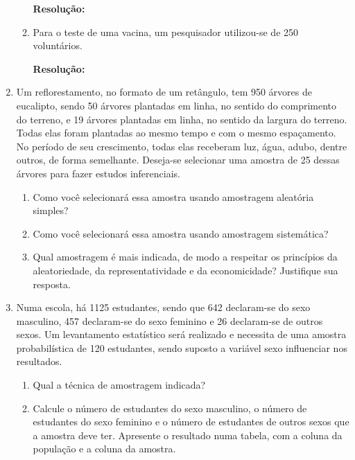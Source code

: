 \begin{enumerate}[label=\emph{\arabic*})]
\begin{enumerate}[label=\emph{\alph*})]
		            \textbf{Resolução:}~

		      \item Para o teste de uma vacina, um pesquisador utilizou-se de 250 voluntários.

		            \textbf{Resolução:}~

	      \end{enumerate}

	\item Um reflorestamento, no formato de um retângulo, tem 950 árvores de eucalipto, sendo
	      50 árvores plantadas em linha, no sentido do comprimento do terreno, e 19 árvores
	      plantadas em linha, no sentido da largura do terreno. Todas elas foram plantadas ao mesmo
	      tempo e com o mesmo espaçamento. No período de seu crescimento, todas elas
	      receberam luz, água, adubo, dentre outros, de forma semelhante. Deseja-se selecionar
	      uma amostra de 25 dessas árvores para fazer estudos inferenciais.

	      \begin{enumerate}[label=\emph{\alph*})]

		      \item Como você selecionará essa amostra usando amostragem aleatória simples?

		      \item Como você selecionará essa amostra usando amostragem sistemática?

		      \item Qual amostragem é mais indicada, de modo a respeitar os princípios da aleatoriedade,
		            da representatividade e da economicidade? Justifique sua resposta.

	      \end{enumerate}

	\item Numa escola, há 1125 estudantes, sendo que 642 declaram-se do sexo masculino, 457
	      declaram-se do sexo feminino e 26 declaram-se de outros sexos. Um levantamento estatístico
	      será realizado e necessita de uma amostra probabilística de 120 estudantes, sendo suposto a
	      variável sexo influenciar nos resultados.

	      \begin{enumerate}[label=\emph{\alph*})]

		      \item Qual a técnica de amostragem indicada?


		      \item Calcule o número de estudantes do sexo masculino, o número de estudantes do sexo
		            feminino e o número de estudantes de outros sexos que a amostra deve ter. Apresente o
		            resultado numa tabela, com a coluna da população e a coluna da amostra.


\end{enumerate}
\end{enumerate}
